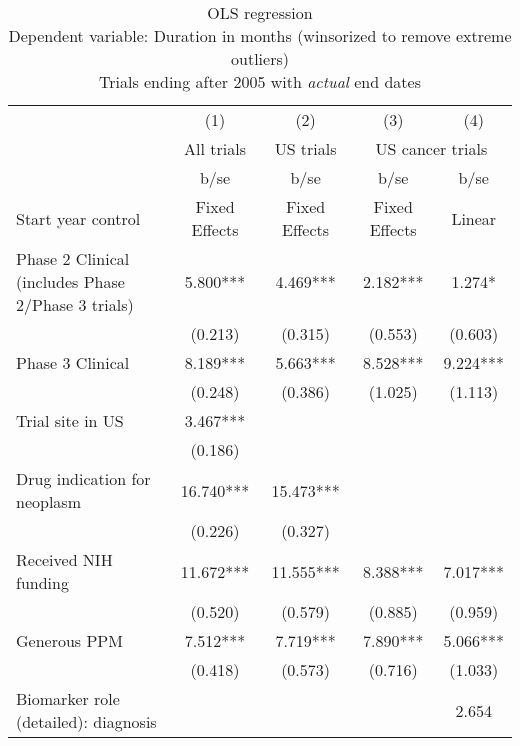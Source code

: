 
\begin{table}[htb]\centering
\caption{OLS regression \\ Dependent variable: Duration in months (winsorized to remove extreme outliers) \\ Trials ending after 2005 with \textit{actual} end dates}
\begin{tabular}{l*{4}c}

                    &     (1)       &         (2)   &       (3)     &     (4)      \\
                    &    All trials  &  US trials & \multicolumn{2}{c}{US cancer trials} \\                    
                    &        b/se   &        b/se   &        b/se   &        b/se   \\
\hline
Start year control&       Fixed Effects   &       Fixed Effects   &      Fixed Effects   &        Linear       \\
Phase 2 Clinical (includes Phase 2/Phase 3 trials)&       5.800***&       4.469***&       2.182***&       1.274*  \\
                    &     (0.213)   &     (0.315)   &     (0.553)   &     (0.603)   \\
Phase 3 Clinical    &       8.189***&       5.663***&       8.528***&       9.224***\\
                    &     (0.248)   &     (0.386)   &     (1.025)   &     (1.113)   \\
Trial site in US    &       3.467***&               &               &               \\
                    &     (0.186)   &               &               &               \\
Drug indication for neoplasm&      16.740***&      15.473***&               &               \\
                    &     (0.226)   &     (0.327)   &               &               \\
Received NIH funding&      11.672***&      11.555***&       8.388***&       7.017***\\
                    &     (0.520)   &     (0.579)   &     (0.885)   &     (0.959)   \\
Generous PPM        &       7.512***&       7.719***&       7.890***&       5.066***\\
                    &     (0.418)   &     (0.573)   &     (0.716)   &     (1.033)   \\
Biomarker role (detailed): diagnosis&               &               &               &       2.654   \\

\end{tabular}
\end{table}
